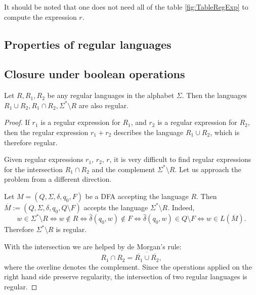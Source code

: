 \begin{page}
\begin{exl}
It should be noted that one does not need all of the table \ref{fig:TableRegExp} to compute the expression $r$.
\end{exl}

\end{page}

\begin{page}

\section{Properties of regular languages}
\subsection{Closure under boolean operations}

\end{page}

\begin{page}

\begin{thm}
\label{thm:ClosRegLang}
Let $R, R_1, R_2$ be any regular languages in the alphabet $\Sigma$.
Then the languages $R_1 \cup R_2, R_1 \cap R_2, \Sigma^* \setminus R$ are also regular.
\end{thm}

\end{page}

\begin{page}

\begin{proof}
If $r_1$ is a regular expression for $R_1$, and $r_2$ is a regular expression for $R_2$,
then the regular expression $r_1 + r_2$ describes the language $R_1 \cup R_2$, which is therefore regular.

Given regular expressions $r_1$, $r_2$, $r$,
it is very difficult to find regular expressions for the intersection $R_1 \cap R_2$ and the complement $\Sigma^* \setminus R$.
Let us approach the problem from a different direction.

Let $M = (Q, \Sigma, \delta, q_0, F)$ be a DFA accepting the language $R$.
Then $\overline{M} := (Q, \Sigma, \delta, q_0, Q \setminus F)$ accepts the language $\Sigma^* \setminus R$.
Indeed,
\[
w \in \Sigma^* \setminus R \Leftrightarrow w \notin R \Leftrightarrow \widehat{\delta}(q_0, w) \notin F
\Leftrightarrow \widehat{\delta}(q_0, w) \in Q \setminus F \Leftrightarrow w \in L(\overline{M}).
\]
Therefore $\Sigma^* \setminus R$ is regular.

With the intersection we are helped by de Morgan's rule:
\[
R_1 \cap R_2 = \overline{\overline{R_1} \cup \overline{R_2}},
\]
where the overline denotes the complement.
Since the operations applied on the right hand side preserve regularity, the intersection of two regular languages is regular.
\end{proof}



\end{page}

